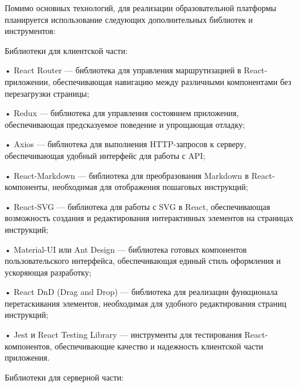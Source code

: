 \subtitlespace

{\gostFont

  \par \redline Помимо основных технологий, для реализации образовательной платформы планируется использование следующих дополнительных библиотек и инструментов:

  \par \redline Библиотеки для клиентской части:

  \par \redline • React Router — библиотека для управления маршрутизацией в React-приложении, обеспечивающая навигацию между различными компонентами без перезагрузки страницы;
  \par \redline • Redux — библиотека для управления состоянием приложения, обеспечивающая предсказуемое поведение и упрощающая отладку;
  \par \redline • Axios — библиотека для выполнения HTTP-запросов к серверу, обеспечивающая удобный интерфейс для работы с API;
  \par \redline • React-Markdown — библиотека для преобразования Markdown в React-компоненты, необходимая для отображения пошаговых инструкций;
  \par \redline • React-SVG — библиотека для работы с SVG в React, обеспечивающая возможность создания и редактирования интерактивных элементов на страницах инструкций;
  \par \redline • Material-UI или Ant Design — библиотека готовых компонентов пользовательского интерфейса, обеспечивающая единый стиль оформления и ускоряющая разработку;
  \par \redline • React DnD (Drag and Drop) — библиотека для реализации функционала перетаскивания элементов, необходимая для удобного редактирования страниц инструкций;
  \par \redline • Jest и React Testing Library — инструменты для тестирования React-компонентов, обеспечивающие качество и надежность клиентской части приложения.

  \par \redline Библиотеки для серверной части:

}
